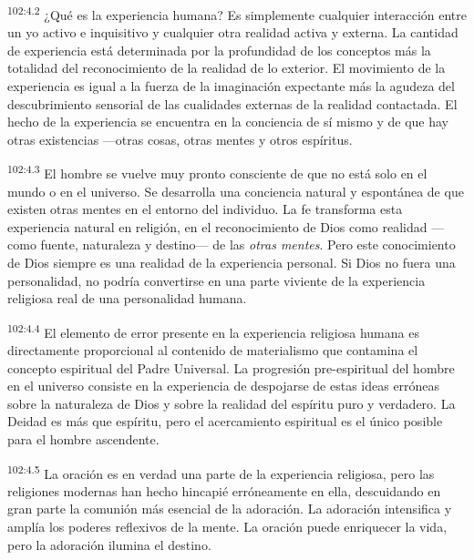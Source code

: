 \documentclass[twoside, 11pt]{book}
\begin{document}
\par
\textsuperscript{102:4.2} ¿Qué es la experiencia humana? Es simplemente cualquier interacción entre un yo activo e inquisitivo y cualquier otra realidad activa y externa. La cantidad de experiencia está determinada por la profundidad de los conceptos más la totalidad del reconocimiento de la realidad de lo exterior. El movimiento de la experiencia es igual a la fuerza de la imaginación expectante más la agudeza del descubrimiento sensorial de las cualidades externas de la realidad contactada. El hecho de la experiencia se encuentra en la conciencia de sí mismo y de que hay otras existencias ---otras cosas, otras mentes y otros espíritus.

\par
\textsuperscript{102:4.3} El hombre se vuelve muy pronto consciente de que no está solo en el mundo o en el universo. Se desarrolla una conciencia natural y espontánea de que existen otras mentes en el entorno del individuo. La fe transforma esta experiencia natural en religión, en el reconocimiento de Dios como realidad ---como fuente, naturaleza y destino--- de las \textit{otras mentes}. Pero este conocimiento de Dios siempre es una realidad de la experiencia personal. Si Dios no fuera una personalidad, no podría convertirse en una parte viviente de la experiencia religiosa real de una personalidad humana.

\par
\textsuperscript{102:4.4} El elemento de error presente en la experiencia religiosa humana es directamente proporcional al contenido de materialismo que contamina el concepto espiritual del Padre Universal. La progresión pre-espiritual del hombre en el universo consiste en la experiencia de despojarse de estas ideas erróneas sobre la naturaleza de Dios y sobre la realidad del espíritu puro y verdadero. La Deidad es más que espíritu, pero el acercamiento espiritual es el único posible para el hombre ascendente.

\par
\textsuperscript{102:4.5} La oración es en verdad una parte de la experiencia religiosa, pero las religiones modernas han hecho hincapié erróneamente en ella, descuidando en gran parte la comunión más esencial de la adoración. La adoración intensifica y amplía los poderes reflexivos de la mente. La oración puede enriquecer la vida, pero la adoración ilumina el destino.
\end{document}
